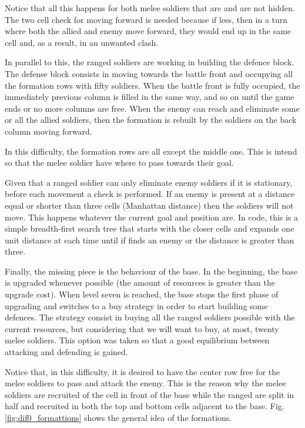 \documentclass[conference]{IEEEtran}
\begin{document}
Notice that all this happens for both melee soldiers that are and are not hidden. The two cell check for moving forward is needed because if less, then in a turn where both the allied and enemy move forward, they would end up in the same cell and, as a result, in an unwanted clash.

In parallel to this, the ranged soldiers are working in building the defence block. The defense block consists in moving towards the battle front and occupying all the formation rows with fifty soldiers. When the battle front is fully occupied, the immediately previous column is filled in the same way, and so on until the game ends or no more columns are free. When the enemy can reach and eliminate some or all the allied soldiers, then the formation is rebuilt by the soldiers on the back column moving forward.

In this difficulty, the formation rows are all except the middle one. This is intend so that the melee soldier have where to pass towards their goal. 

Given that a ranged soldier can only eliminate enemy soldiers if it is stationary, before each movement a check is performed. If an enemy is present at a distance equal or shorter than three cells (Manhattan distance) then the soldiers will not move. This happens whatever the current goal and position are. In code, this is a simple breadth-first search tree that starts with the closer cells and expands one unit distance at each time until if finds an enemy or the distance is greater than three.

Finally, the missing piece is the behaviour of the base. In the beginning, the base is upgraded whenever possible (the amount of resources is greater than the upgrade cost). When level seven is reached, the base stops the first phase of upgrading and switches to a buy strategy in order to start building some defences. The strategy consist in buying all the ranged soldiers possible with the current resources, but considering that we will want to buy, at most, twenty melee soldiers. This option was taken so that a good equilibrium between attacking and defending is gained.

Notice that, in this difficulty, it is desired to have the center row free for the melee soldiers to pass and attack the enemy. This is the reason why the melee soldiers are recruited of the cell in front of the base while the ranged are split in half and recruited in both the top and bottom cells adjacent to the base. Fig. \ref{fig:dif0_formattions} shows the general idea of the formations.
\end{document}
